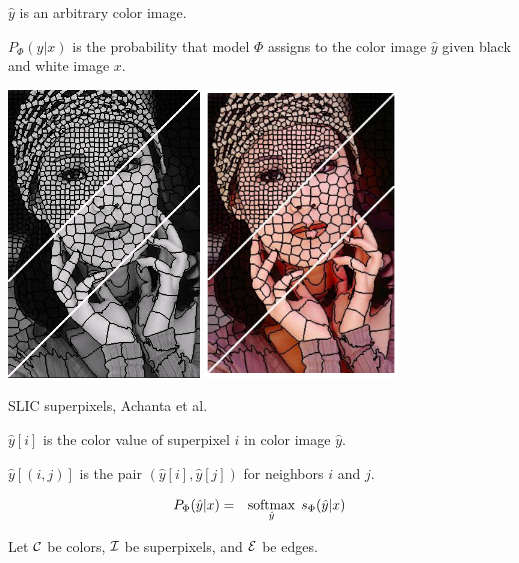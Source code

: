 {\vfill
$\hat{y}$ is an arbitrary color image.

\vfill
$P_\Phi(\hat{y}|x)$ is the probability that model $\Phi$ assigns to the color image $\hat{y}$ given black and white image $x$.

\centerline{\includegraphics[height = 3in]{../images/SLIC} \hspace{.5in} \includegraphics[height = 3in]{../images/SLICcolor}}
\centerline{\huge SLIC superpixels, Achanta et al.}

\vfill
$\hat{y}[i]$ is the color value of superpixel $i$ in color image $\hat{y}$.

\vfill
$\hat{y}[(i,j)]$ is the pair $(\hat{y}[i],\hat{y}[j])$ for neighbors $i$ and $j$.


\begin{eqnarray*}
P_\Phi(\hat{y}|x) & = & \operatorname*{softmax}_{\hat{y}}\;s_\Phi(\hat{y}|x)
\end{eqnarray*}

\vfill
Let ${\cal C}$ be colors, ${\cal I}$ be superpixels, and ${\cal E}$ be edges.

}
